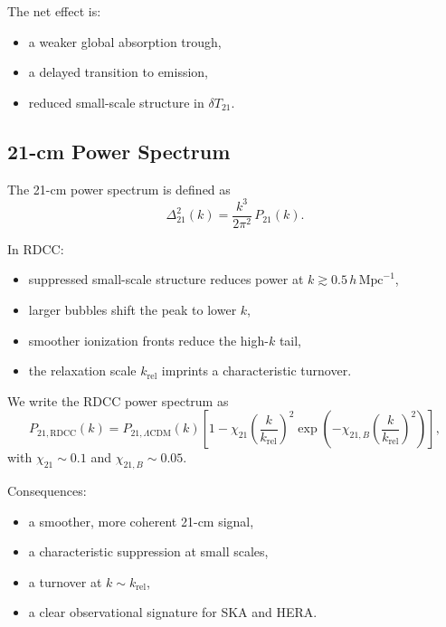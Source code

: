 \documentclass[11pt,a4paper]{article}
\begin{document}
The net effect is:
\begin{itemize}
\item a weaker global absorption trough,
\item a delayed transition to emission,
\item reduced small-scale structure in $\delta T_{21}$.
\end{itemize}

\subsection{21-cm Power Spectrum}

The 21-cm power spectrum is defined as
\begin{equation}
\Delta^{2}_{21}(k)
=
\frac{k^{3}}{2\pi^{2}}\,P_{21}(k).
\end{equation}

In RDCC:
\begin{itemize}
\item suppressed small-scale structure reduces power at $k \gtrsim 0.5\,h\,\mathrm{Mpc}^{-1}$,
\item larger bubbles shift the peak to lower $k$,
\item smoother ionization fronts reduce the high-$k$ tail,
\item the relaxation scale $k_{\mathrm{rel}}$ imprints a characteristic turnover.
\end{itemize}

We write the RDCC power spectrum as
\begin{equation}
P_{21,\mathrm{RDCC}}(k)
=
P_{21,\Lambda\mathrm{CDM}}(k)
\left[
1
-
\chi_{21}
\left(
\frac{k}{k_{\mathrm{rel}}}
\right)^{2}
\exp\!\left(
-
\chi_{21,B}
\left(
\frac{k}{k_{\mathrm{rel}}}
\right)^{2}
\right)
\right],
\end{equation}
with $\chi_{21} \sim 0.1$ and $\chi_{21,B} \sim 0.05$.

Consequences:
\begin{itemize}
\item a smoother, more coherent 21-cm signal,
\item a characteristic suppression at small scales,
\item a turnover at $k \sim k_{\mathrm{rel}}$,
\item a clear observational signature for SKA and HERA.
\end{itemize}

\end{document}
